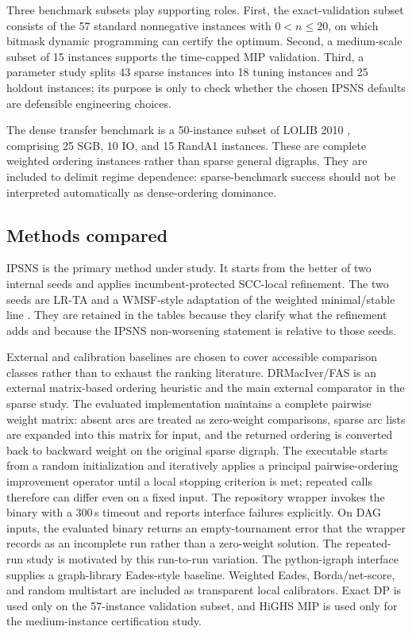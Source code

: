Three benchmark subsets play supporting roles. First, the exact-validation subset consists of the 57 standard nonnegative instances with \(0<n\le 20\), on which bitmask dynamic programming can certify the optimum. Second, a medium-scale subset of 15 instances supports the time-capped MIP validation. Third, a parameter study splits 43 sparse instances into 18 tuning instances and 25 holdout instances; its purpose is only to check whether the chosen IPSNS defaults are defensible engineering choices.

The dense transfer benchmark is a 50-instance subset of LOLIB 2010 \cite{MRD12,lolib_library}, comprising 25 SGB, 10 IO, and 15 RandA1 instances. These are complete weighted ordering instances rather than sparse general digraphs. They are included to delimit regime dependence: sparse-benchmark success should not be interpreted automatically as dense-ordering dominance.

\subsection{Methods compared}

IPSNS is the primary method under study. It starts from the better of two internal seeds and applies incumbent-protected SCC-local refinement. The two seeds are LR-TA and a WMSF-style adaptation of the weighted minimal/stable line \cite{CC25,CCP24}. They are retained in the tables because they clarify what the refinement adds and because the IPSNS non-worsening statement is relative to those seeds.

External and calibration baselines are chosen to cover accessible comparison classes rather than to exhaust the ranking literature. DRMacIver/FAS \cite{drmaciver_feedback_arc_set} is an external matrix-based ordering heuristic and the main external comparator in the sparse study. The evaluated implementation maintains a complete pairwise weight matrix: absent arcs are treated as zero-weight comparisons, sparse arc lists are expanded into this matrix for input, and the returned ordering is converted back to backward weight on the original sparse digraph. The executable starts from a random initialization and iteratively applies a principal pairwise-ordering improvement operator until a local stopping criterion is met; repeated calls therefore can differ even on a fixed input. The repository wrapper invokes the binary with a 300\,s timeout and reports interface failures explicitly. On DAG inputs, the evaluated binary returns an empty-tournament error that the wrapper records as an incomplete run rather than a zero-weight solution. The repeated-run study is motivated by this run-to-run variation. The python-igraph interface \cite{python_igraph_feedback_arc_set} supplies a graph-library Eades-style baseline. Weighted Eades, Borda/net-score, and random multistart are included as transparent local calibrators. Exact DP is used only on the 57-instance validation subset, and HiGHS MIP is used only for the medium-instance certification study.

